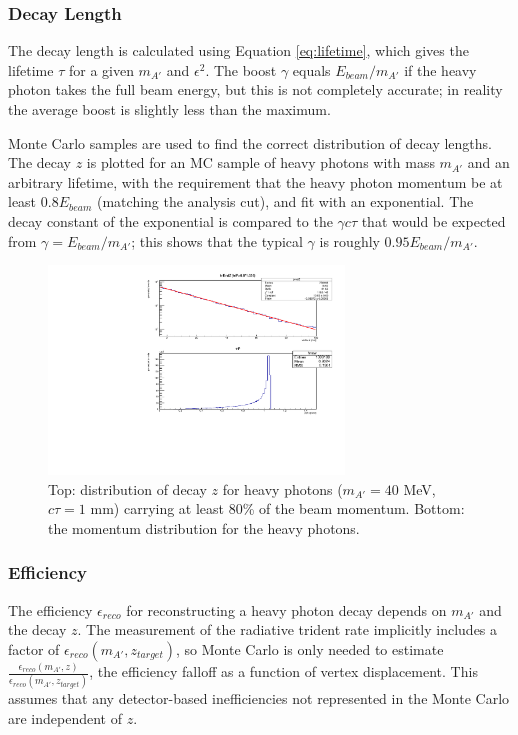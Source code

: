 \subsubsection{Decay Length}
The decay length is calculated using Equation \ref{eq:lifetime}, which gives the lifetime $\tau$ for a given $m_{A'}$ and $\epsilon^2$.
The boost $\gamma$ equals $E_{beam}/m_{A'}$ if the heavy photon takes the full beam energy, but this is not completely accurate; in reality the average boost is slightly less than the maximum.

Monte Carlo samples are used to find the correct distribution of decay lengths.
The decay $z$ is plotted for an MC sample of heavy photons with mass $m_{A'}$ and an arbitrary lifetime, with the requirement that the heavy photon momentum be at least $0.8E_{beam}$ (matching the analysis cut), and fit with an exponential.
The decay constant of the exponential is compared to the $\gamma c \tau$ that would be expected from $\gamma=E_{beam}/m_{A'}$; this shows that the typical $\gamma$ is roughly $0.95E_{beam}/m_{A'}$.

\begin{figure}[ht]
\begin{center}
    \includegraphics[width=0.7\textwidth,page=1,angle=-90]{vertexing/figs/acceptance_40}
\end{center}
    \caption{Top: distribution of decay $z$ for heavy photons ($m_{A'}=40$ MeV, $c\tau=1$ mm) carrying at least 80\% of the beam momentum. Bottom: the momentum distribution for the heavy photons.}
    \label{fig:decay_z_truth}
\end{figure}

\subsubsection{Efficiency}
\label{sec:efficiency_z}

The efficiency $\epsilon_{reco}$ for reconstructing a heavy photon decay depends on $m_{A'}$ and the decay $z$.
The measurement of the radiative trident rate implicitly includes a factor of $\epsilon_{reco}(m_{A'},z_{target})$, so Monte Carlo is only needed to estimate $\frac{\epsilon_{reco}(m_{A'},z)}{\epsilon_{reco}(m_{A'},z_{target})}$, the efficiency falloff as a function of vertex displacement.
This assumes that any detector-based inefficiencies not represented in the Monte Carlo are independent of $z$.

